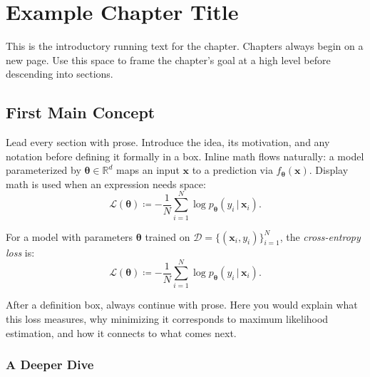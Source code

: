 \documentclass[11pt, oneside]{book}
\newcommand{\R}{\mathbb{R}}
\newcommand{\Prob}{\mathbb{P}}           %
\newcommand{\loss}{\mathcal{L}}          %
\newcommand{\dataset}{\mathcal{D}}       %
\newcommand{\params}{\boldsymbol{\theta}}   %
\newcommand{\xvec}{\mathbf{x}}
\newcommand{\given}{\,\vert\,}           %
\newcommand{\eqdef}{\coloneqq}           %
\begin{document}
\setcounter{tocdepth}{2}  %

\begingroup
  \let\cleardoublepage\relax
  \let\clearpage\relax
  \tableofcontents
\endgroup

\mainmatter  %


\chapter{Example Chapter Title}

This is the introductory running text for the chapter.
Chapters always begin on a new page.
Use this space to frame the chapter's goal at a high level
before descending into sections.

\section{First Main Concept}

Lead every section with prose.
Introduce the idea, its motivation, and any notation before
defining it formally in a box.
Inline math flows naturally: a model parameterized by
$\params \in \R^d$ maps an input $\xvec$ to a prediction via
$f_{\params}(\xvec)$.
Display math is used when an expression needs space:
\[
  \loss(\params) \eqdef -\frac{1}{N}\sum_{i=1}^{N}
    \log p_{\params}(y_i \given \xvec_i).
\]

\begin{defbox}[title={Cross-Entropy Loss}]
For a model with parameters $\params$ trained on
$\dataset = \{(\xvec_i, y_i)\}_{i=1}^{N}$,
the \emph{cross-entropy loss} is:
\[
  \loss(\params) \eqdef -\frac{1}{N}\sum_{i=1}^{N}
    \log p_{\params}(y_i \given \xvec_i).
\]
\end{defbox}

After a definition box, always continue with prose.
Here you would explain what this loss measures, why
minimizing it corresponds to maximum likelihood estimation,
and how it connects to what comes next.

\subsection{A Deeper Dive}
\end{document}
